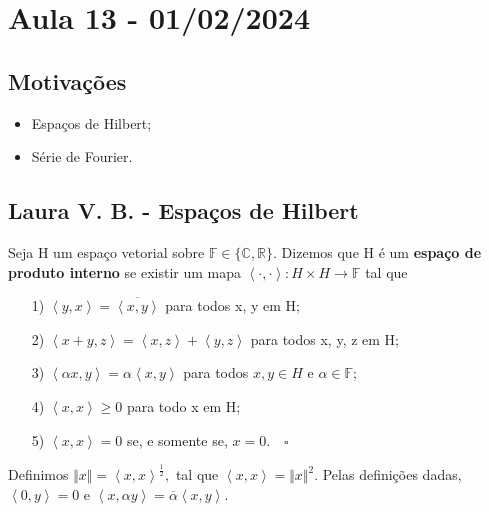 \documentclass[measure_theory.tex]{subfiles}
\begin{document}
\section{Aula 13 - 01/02/2024}
\subsection{Motivações}
\begin{itemize}
	\item Espaços de Hilbert;
	\item Série de Fourier.
\end{itemize}
\subsection{Laura V. B. - Espaços de Hilbert}
\begin{def*}
	Seja H um espaço vetorial sobre \(\mathbb{F}\in\{\mathbb{C}, \mathbb{R}\}\). Dizemos que H é um \textbf{espaço de produto interno} se existir um mapa
	\(\left< \cdot , \cdot  \right>:H \times H\rightarrow \mathbb{F}\) tal que
	\begin{itemize}
		\item[1)] \(\left< y, x \right> = \overline{\left< x, y \right>}\) para todos x, y em H;
		\item[2)] \(\left< x + y, z \right> = \left< x, z \right> + \left< y, z \right>\) para todos x, y, z em H;
		\item[3)] \(\left< \alpha x, y \right> = \alpha \left< x, y \right>\) para todos \(x, y\in H\) e \(\alpha \in \mathbb{F};\)
		\item[4)] \(\left< x, x \right> \geq 0\) para todo x em H;
		\item[5)] \(\left< x, x \right> = 0\) se, e somente se, \(x=0.\quad \square\)
	\end{itemize}
\end{def*}
Definimos \(\Vert x \Vert = \left< x, x \right>^{\frac{1}{2}},\) tal que \(\left< x, x \right> = \Vert x \Vert^{2}.\) Pelas definições dadas, \(\left< 0, y \right> = 0\) e
\(\left< x, \alpha y \right> = \overline{\alpha }\left< x, y \right>.\)
\end{document}
